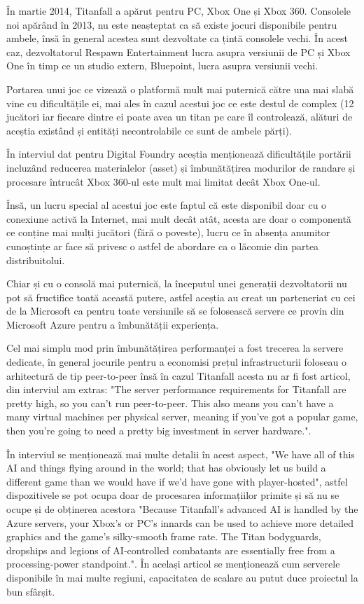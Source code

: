 În martie 2014, Titanfall a apărut pentru PC, Xbox One și Xbox 360. Consolele noi apărând în 2013, nu este 
neașteptat ca să existe jocuri disponibile pentru ambele, însă în general acestea sunt dezvoltate
ca țintă consolele vechi. În acest caz, dezvoltatorul Respawn Entertainment lucra asupra versiunii de PC și
Xbox One în timp ce un studio extern, Bluepoint, lucra asupra versiunii vechi.

Portarea unui joc ce vizează o platformă mult mai puternică către una mai slabă vine cu dificultățile ei,
mai ales în cazul acestui joc ce este destul de complex (12 jucători iar fiecare dintre ei poate avea 
un titan pe care îl controlează, alături de aceștia existând și entități necontrolabile ce sunt de ambele părți).

În interviul dat pentru Digital Foundry \cite{leadbetter_2014} aceștia menționează dificultățile portării
incluzând reducerea materialelor (asset) și îmbunătățirea modurilor de randare și procesare întrucât 
Xbox 360-ul este mult mai limitat decât Xbox One-ul.

Însă, un lucru special al acestui joc este faptul că este disponibil doar cu o conexiune activă la Internet,
mai mult decât atât, acesta are doar o componentă ce conține mai mulți jucători (fără o poveste), lucru 
ce în absența anumitor cunoștințe ar face să privesc o astfel de abordare ca o lăcomie din partea
distribuitolui.

Chiar și cu o consolă mai puternică, la începutul unei generații dezvoltatorii nu pot să fructifice
toată această putere, astfel aceștia au creat un parteneriat cu cei de la Microsoft ca pentru toate 
versiunile să se folosească servere ce provin din Microsoft Azure pentru a îmbunătății experiența.

Cel mai simplu mod prin îmbunătățirea performanței a fost trecerea la servere dedicate, în general 
jocurile pentru a economisi prețul infrastructurii foloseau o arhitectură de tip peer-to-peer însă 
în cazul Titanfall acesta nu ar fi fost articol, din interviul \cite{leadbetter_2014} am extras:
"The server performance requirements for Titanfall are pretty high, so you can't run peer-to-peer. 
This also means you can't have a many virtual machines per physical server, 
meaning if you've got a popular game, then you're going to need a pretty big investment in 
server hardware.".

În interviul \cite{seppala_2014} se menționează mai multe detalii în acest aspect,
"We have all of this AI and things flying around in the world; that has obviously let us build a 
different game than we would have if we'd have gone with player-hosted", astfel dispozitivele se pot ocupa doar de procesarea informațiilor primite
și să nu se ocupe și de obținerea acestora
"Because Titanfall's advanced AI is handled by the Azure servers, your Xbox's or PC's innards can be used to achieve more detailed graphics 
and the game's silky-smooth frame rate. The Titan bodyguards, 
dropships and legions of AI-controlled combatants are essentially free 
from a processing-power standpoint.".
În același articol se menționează cum serverele disponibile în mai multe regiuni, capacitatea de scalare 
au putut duce proiectul la bun sfârșit.

